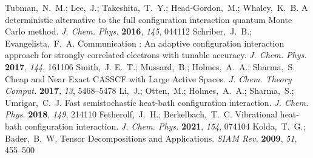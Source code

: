 \documentclass[journal=jctcce]{achemso}
\begin{document}
\begin{mcitethebibliography}{79}
\mciteBstWouldAddEndPuncttrue
\mciteSetBstMidEndSepPunct{\mcitedefaultmidpunct}
{\mcitedefaultendpunct}{\mcitedefaultseppunct}\relax
\EndOfBibitem
{}
Tubman,~N.~M.; Lee,~J.; Takeshita,~T.~Y.; Head-Gordon,~M.; Whaley,~K.~B. {A
  deterministic alternative to the full configuration interaction quantum Monte
  Carlo method}. \emph{J. Chem. Phys.} \textbf{2016}, \emph{145}, 044112\relax
\mciteBstWouldAddEndPuncttrue
\mciteSetBstMidEndSepPunct{\mcitedefaultmidpunct}
{\mcitedefaultendpunct}{\mcitedefaultseppunct}\relax
\EndOfBibitem
{}
Schriber,~J.~B.; Evangelista,~F.~A. {Communication : An adaptive configuration
  interaction approach for strongly correlated electrons with tunable
  accuracy}. \emph{J. Chem. Phys.} \textbf{2017}, \emph{144}, 161106\relax
\mciteBstWouldAddEndPuncttrue
\mciteSetBstMidEndSepPunct{\mcitedefaultmidpunct}
{\mcitedefaultendpunct}{\mcitedefaultseppunct}\relax
\EndOfBibitem
{}
Smith,~J. E.~T.; Mussard,~B.; Holmes,~A.~A.; Sharma,~S. {Cheap and Near Exact
  CASSCF with Large Active Spaces}. \emph{J. Chem. Theory Comput.}
  \textbf{2017}, \emph{13}, 5468--5478\relax
\mciteBstWouldAddEndPuncttrue
\mciteSetBstMidEndSepPunct{\mcitedefaultmidpunct}
{\mcitedefaultendpunct}{\mcitedefaultseppunct}\relax
\EndOfBibitem
{}
Li,~J.; Otten,~M.; Holmes,~A.~A.; Sharma,~S.; Umrigar,~C.~J. {Fast
  semistochastic heat-bath configuration interaction}. \emph{J. Chem. Phys.}
  \textbf{2018}, \emph{149}, 214110\relax
\mciteBstWouldAddEndPuncttrue
\mciteSetBstMidEndSepPunct{\mcitedefaultmidpunct}
{\mcitedefaultendpunct}{\mcitedefaultseppunct}\relax
\EndOfBibitem
{}
Fetherolf,~J.~H.; Berkelbach,~T.~C. {Vibrational heat-bath configuration
  interaction}. \emph{J. Chem. Phys.} \textbf{2021}, \emph{154}, 074104\relax
\mciteBstWouldAddEndPuncttrue
\mciteSetBstMidEndSepPunct{\mcitedefaultmidpunct}
{\mcitedefaultendpunct}{\mcitedefaultseppunct}\relax
\EndOfBibitem
{}
Kolda,~T.~G.; Bader,~B.~W. {Tensor Decompositions and Applications}. \emph{SIAM
  Rev.} \textbf{2009}, \emph{51}, 455--500\relax
\mciteBstWouldAddEndPuncttrue
\mciteSetBstMidEndSepPunct{\mcitedefaultmidpunct}

\end{mcitethebibliography}
\end{document}
